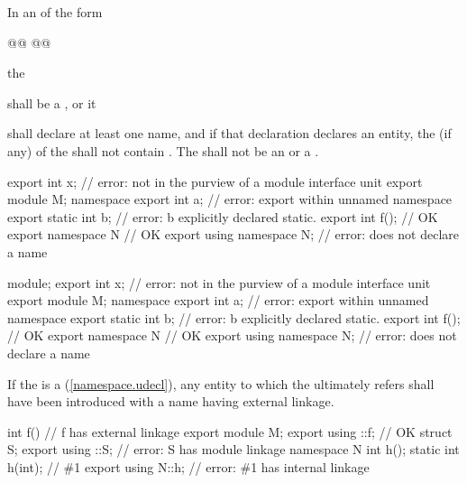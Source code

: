 \begin{std.txt}
  \alinea
  In an  of the form
  \begin{grammar}
        @@ @@
  \end{grammar}
  the 
  \begin{before}\color{addclr}
  shall be a , or it
  \end{before}
  shall declare at least one name,
  and if that declaration declares an entity, the 
   (if any) of the 
   shall not contain .
  The  shall not be an
  or a .
  \begin{example}
  \begin{before}\color{addclr}
    \begin{codeblock}
      export int x;             // error: not in the purview of a module interface unit
      export module M;
      namespace {
        export int a;           // error: export within unnamed namespace
      }
      export static int b;      // error: b explicitly declared static.
      export int f();           // OK
      export namespace N { }    // OK
      export using namespace N; // error: does not declare a name
    \end{codeblock}
  \end{before}\begin{after}\color{addclr}
    \begin{codeblock}
      module;
      export int x;             // error: not in the purview of a module interface unit
      export module M;
      namespace {
        export int a;           // error: export within unnamed namespace
      }
      export static int b;      // error: b explicitly declared static.
      export int f();           // OK
      export namespace N { }    // OK
      export using namespace N; // error: does not declare a name
    \end{codeblock}
  \end{after}
  \end{example}

  If the  is a 
  (\ref{namespace.udecl}), any entity to which the
   ultimately refers shall have been introduced
  with a name having external linkage.
  \begin{example}
    \begin{codeblock}
      int f()               // f has external linkage
      export module M;
      export using ::f;     // OK
      struct S;
      export using ::S;     // error: S has module linkage
      namespace N {
        int h();
        static int h(int);  // \#1
      }
      export using N::h;    // error: \#1 has internal linkage
    \end{codeblock}
  \end{example}



\end{std.txt}

